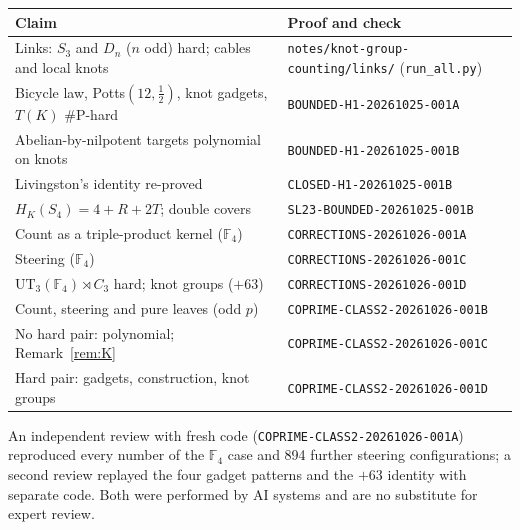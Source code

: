 \documentclass[11pt]{article}
\theoremstyle{definition}
\theoremstyle{remark}
\newcommand{\F}{\mathbb{F}}
\newcommand{\sharpP}{\#\mathrm{P}}
\begin{document}
\begin{center}
\begin{tabular}{@{}p{}p{}@{}}
\toprule
Claim & Proof and check\\
\midrule
Links: $S_3$ and $D_n$ ($n$ odd) hard; cables and local knots & \texttt{notes/knot-group-counting/links/} (\texttt{run\_all.py})\\
Bicycle law, Potts$(12,\tfrac12)$, knot gadgets, $T(K)$ $\sharpP$-hard & \texttt{BOUNDED-H1-20261025-001A}\\
Abelian-by-nilpotent targets polynomial on knots & \texttt{BOUNDED-H1-20261025-001B}\\
Livingston's identity re-proved & \texttt{CLOSED-H1-20261025-001B}\\
$H_K(S_4)=4+R+2T$; double covers & \texttt{SL23-BOUNDED-20261025-001B}\\
Count as a triple-product kernel ($\F_4$) & \texttt{CORRECTIONS-20261026-001A}\\
Steering ($\F_4$) & \texttt{CORRECTIONS-20261026-001C}\\
$\mathrm{UT}_3(\F_4)\rtimes C_3$ hard; knot groups ($+63$) & \texttt{CORRECTIONS-20261026-001D}\\
Count, steering and pure leaves (odd $p$) & \texttt{COPRIME-CLASS2-20261026-001B}\\
No hard pair: polynomial; Remark~\ref{rem:K} & \texttt{COPRIME-CLASS2-20261026-001C}\\
Hard pair: gadgets, construction, knot groups & \texttt{COPRIME-CLASS2-20261026-001D}\\
\bottomrule
\end{tabular}
\end{center}

An independent review with fresh code (\texttt{COPRIME-CLASS2-20261026-001A})
reproduced every number of the $\F_4$ case and 894 further steering
configurations; a second review replayed the four gadget patterns and the
$+63$ identity with separate code. Both were performed by AI systems and are
no substitute for expert review.
\end{document}
